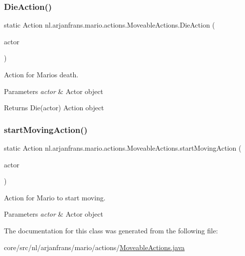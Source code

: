 \subsubsection{\texorpdfstring{Die\+Action()}{DieAction()}}
{\footnotesize\ttfamily static Action nl.\+arjanfrans.\+mario.\+actions.\+Moveable\+Actions.\+Die\+Action (\begin{DoxyParamCaption}\item[{Actor}]{actor }\end{DoxyParamCaption})\hspace{0.3cm}{\ttfamily [static]}}



Action for Mario\textquotesingle{}s death. 


\begin{DoxyParams}{Parameters}
{\em actor} & Actor object \\
\hline
\end{DoxyParams}
\begin{DoxyReturn}{Returns}
Die(actor) Action object 
\end{DoxyReturn}
\mbox{\label{classnl_1_1arjanfrans_1_1mario_1_1actions_1_1MoveableActions_a0e2c6b25d672aec6c1f30a93b55bd0f9}} 
\subsubsection{\texorpdfstring{start\+Moving\+Action()}{startMovingAction()}}
{\footnotesize\ttfamily static Action nl.\+arjanfrans.\+mario.\+actions.\+Moveable\+Actions.\+start\+Moving\+Action (\begin{DoxyParamCaption}\item[{Actor}]{actor }\end{DoxyParamCaption})\hspace{0.3cm}{\ttfamily [static]}}



Action for Mario to start moving. 


\begin{DoxyParams}{Parameters}
{\em actor} & Actor object \\
\hline
\end{DoxyParams}


The documentation for this class was generated from the following file\+:\begin{DoxyCompactItemize}
\item 
core/src/nl/arjanfrans/mario/actions/\hyperlink{MoveableActions_8java}{Moveable\+Actions.\+java}\end{DoxyCompactItemize}
